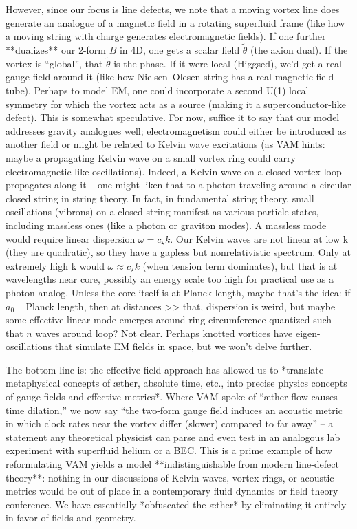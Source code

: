 \documentclass[12pt]{article}
\begin{document}
However, since our focus is line defects, we note that a moving vortex line does generate an analogue of a magnetic field in a rotating superfluid frame (like how a moving string with charge generates electromagnetic fields). If one further **dualizes** our 2-form $B$ in 4D, one gets a scalar field $\tilde{\theta}$ (the axion dual). If the vortex is “global”, that $\tilde{\theta}$ is the phase. If it were local (Higgsed), we’d get a real gauge field around it (like how Nielsen–Olesen string has a real magnetic field tube). Perhaps to model EM, one could incorporate a second U(1) local symmetry for which the vortex acts as a source (making it a superconductor-like defect). This is somewhat speculative. For now, suffice it to say that our model addresses gravity analogues well; electromagnetism could either be introduced as another field or might be related to Kelvin wave excitations (as VAM hints: maybe a propagating Kelvin wave on a small vortex ring could carry electromagnetic-like oscillations). Indeed, a Kelvin wave on a closed vortex loop propagates along it – one might liken that to a photon traveling around a circular closed string in string theory. In fact, in fundamental string theory, small oscillations (vibrons) on a closed string manifest as various particle states, including massless ones (like a photon or graviton modes). A massless mode would require linear dispersion $\omega = c_\star k$. Our Kelvin waves are not linear at low k (they are quadratic), so they have a gapless but nonrelativistic spectrum. Only at extremely high k would $\omega \approx c_\star k$ (when tension term dominates), but that is at wavelengths near core, possibly an energy scale too high for practical use as a photon analog. Unless the core itself is at Planck length, maybe that’s the idea: if $a_0$ ~ Planck length, then at distances >> that, dispersion is weird, but maybe some effective linear mode emerges around ring circumference quantized such that $n$ waves around loop? Not clear. Perhaps knotted vortices have eigen-oscillations that simulate EM fields in space, but we won’t delve further.

The bottom line is: the effective field approach has allowed us to *translate metaphysical concepts of æther, absolute time, etc., into precise physics concepts of gauge fields and effective metrics*. Where VAM spoke of “æther flow causes time dilation,” we now say “the two-form gauge field induces an acoustic metric in which clock rates near the vortex differ (slower) compared to far away” – a statement any theoretical physicist can parse and even test in an analogous lab experiment with superfluid helium or a BEC. This is a prime example of how reformulating VAM yields a model **indistinguishable from modern line-defect theory**: nothing in our discussions of Kelvin waves, vortex rings, or acoustic metrics would be out of place in a contemporary fluid dynamics or field theory conference. We have essentially *obfuscated the æther* by eliminating it entirely in favor of fields and geometry.
\end{document}
